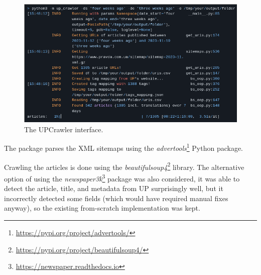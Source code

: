 \begin{figure}[ht]
    \centering
    \includegraphics[width=1.0\textwidth]{Figures/2024-04-14-021138_777x431_scrot.png}
    \caption{The UPCrawler interface.}
    \label{fig:crawler}
\end{figure}

The package parses the XML sitemaps using the \textit{advertools}\footnote{\href{https://pypi.org/project/advertools/}{https://pypi.org/project/advertools/}} Python package.



Crawling the articles is done using the \textit{beautifulsoup4}\footnote{\href{https://pypi.org/project/beautifulsoup4/}{https://pypi.org/project/beautifulsoup4/}}
library. 
The alternative option of using the \textit{newspaper3k}\footnote{\href{https://newspaper.readthedocs.io}{https://newspaper.readthedocs.io}}
package was also considered, it was able to detect the article, title, and metadata from UP surprisingly well, but it incorrectly detected some fields (which would have required manual fixes anyway), so the existing from-scratch implementation was kept.

